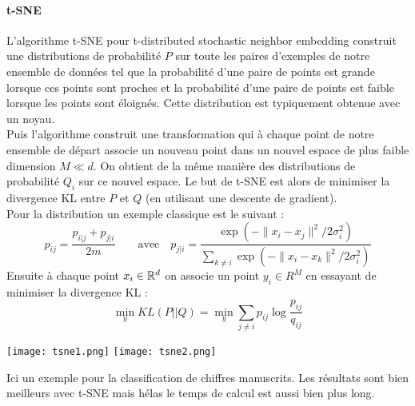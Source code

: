 \paragraph{t-SNE}
L'algorithme t-SNE pour t-distributed stochastic neighbor embedding construit une distributions de probabilité $P$ sur toute les paires d'exemples de notre ensemble de données tel que la probabilité d'une paire de points est grande lorsque ces points sont proches et la probabilité d'une paire de points est faible lorsque les points sont éloignés. Cette distribution est typiquement obtenue avec un noyau. \\
Puis l'algorithme construit une transformation qui à chaque point de notre ensemble de départ associe un nouveau point dans un nouvel espace de plus faible dimension $M \ll d$. On obtient de la même manière des distributions de probabilité $Q_i$ sur ce nouvel espace. Le but de t-SNE est alors de minimiser la divergence KL entre $P$ et $Q$ (en utilisant une descente de gradient). \\
Pour la distribution un exemple classique est le suivant :
$$ p_{ij} = \dfrac{p_{i|j} + p_{j|i}}{2 m} \qquad \text{avec} \quad p_{j|i} = \dfrac{\exp \left( - \| x_i - x_j \|^2 / 2 \sigma_i^2 \right)}{\sum_{k \neq i} \exp \left( - \| x_i - x_k \|^2 / 2 \sigma_i^2 \right)} $$
Ensuite à chaque point $x_i \in \mathbb{R}^d$ on associe un point $y_i \in R^M$ en essayant de minimiser la divergence KL :
$$ \min_y KL(P || Q) = \min_y \sum_{j \neq i} p_{ij} \log \dfrac{p_{ij}}{q_{ij}} $$
\begin{center}
	\texttt{[image: tsne1.png]}
	\texttt{[image: tsne2.png]}
\end{center}
Ici un exemple pour la classification de chiffres manuscrits. Les résultats sont bien meilleurs avec t-SNE mais hélas le temps de calcul est aussi bien plus long.